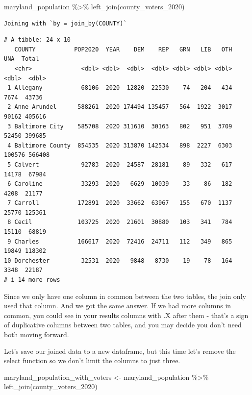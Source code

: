 \documentclass[
  letterpaper,
  DIV=11,
  numbers=noendperiod]{scrreprt}
\newenvironment{Shaded}{\begin{snugshade}}{\end{snugshade}}
\newcommand{\FunctionTok}[1]{\textcolor[rgb]{0.28,0.35,0.67}{#1}}
\newcommand{\NormalTok}[1]{\textcolor[rgb]{0.00,0.23,0.31}{#1}}
\newcommand{\OtherTok}[1]{\textcolor[rgb]{0.00,0.23,0.31}{#1}}
\newcommand{\SpecialCharTok}[1]{\textcolor[rgb]{0.37,0.37,0.37}{#1}}
\begin{document}
\begin{Shaded}
\begin{Highlighting}[]
\NormalTok{maryland\_population }\SpecialCharTok{\%\textgreater{}\%} \FunctionTok{left\_join}\NormalTok{(county\_voters\_2020)}
\end{Highlighting}
\end{Shaded}

\begin{verbatim}
Joining with `by = join_by(COUNTY)`
\end{verbatim}

\begin{verbatim}
# A tibble: 24 x 10
   COUNTY           POP2020  YEAR    DEM    REP   GRN   LIB   OTH    UNA  Total
   <chr>              <dbl> <dbl>  <dbl>  <dbl> <dbl> <dbl> <dbl>  <dbl>  <dbl>
 1 Allegany           68106  2020  12820  22530    74   204   434   7674  43736
 2 Anne Arundel      588261  2020 174494 135457   564  1922  3017  90162 405616
 3 Baltimore City    585708  2020 311610  30163   802   951  3709  52450 399685
 4 Baltimore County  854535  2020 313870 142534   898  2227  6303 100576 566408
 5 Calvert            92783  2020  24587  28181    89   332   617  14178  67984
 6 Caroline           33293  2020   6629  10039    33    86   182   4208  21177
 7 Carroll           172891  2020  33662  63967   155   670  1137  25770 125361
 8 Cecil             103725  2020  21601  30880   103   341   784  15110  68819
 9 Charles           166617  2020  72416  24711   112   349   865  19849 118302
10 Dorchester         32531  2020   9848   8730    19    78   164   3348  22187
# i 14 more rows
\end{verbatim}

Since we only have one column in common between the two tables, the join
only used that column. And we got the same answer. If we had more
columns in common, you could see in your results columns with .X after
them - that's a sign of duplicative columns between two tables, and you
may decide you don't need both moving forward.

Let's save our joined data to a new dataframe, but this time let's
remove the select function so we don't limit the columns to just three.

\begin{Shaded}
\begin{Highlighting}[]
\NormalTok{maryland\_population\_with\_voters }\OtherTok{\textless{}{-}}\NormalTok{ maryland\_population }\SpecialCharTok{\%\textgreater{}\%} \FunctionTok{left\_join}\NormalTok{(county\_voters\_2020)}
\end{Highlighting}
\end{Shaded}
\end{document}
